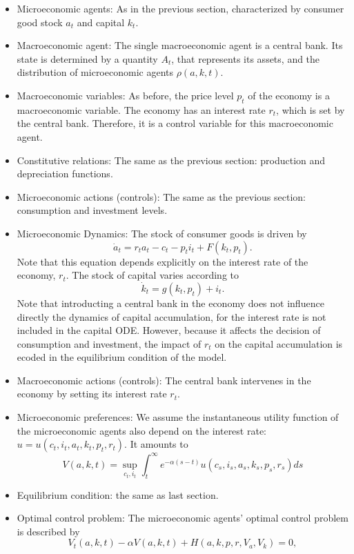 \documentclass{article}
\begin{document}
\begin{itemize}
    \item Microeconomic agents: As in the previous section, characterized by
    consumer good stock $a_t$ and capital $k_t$.
    \item Macroeconomic agent: The single macroeconomic agent is a central bank.
    Its state is determined by a quantity $A_t$, that represents its assets, and
    the distribution of microeconomic agents $\rho(a,k,t)$.
    \item Macroeconomic variables: As before, the price level $p_t$ of the economy is a macroeconomic
    variable. The economy has an interest rate $r_t$, which is set by the central bank. Therefore, it 
    is a control variable for this macroeconomic agent.
    \item Constitutive relations: The same as the previous section: production and depreciation functions.
    \item Microeconomic actions (controls): The same as the previous section: consumption and investment levels.
    \item Microeconomic Dynamics:
    The stock of consumer goods is driven by 
    $$
    \dot a_t = r_t a_t - c_t - p_t i_t + F(k_t, p_t).
    $$
    Note that this equation depends explicitly on the interest rate of the economy, $r_t$.
    The stock of capital varies according to
    $$
    \dot k_t = g(k_t, p_t) + i_t.
    $$
    Note that introducting a central bank in the economy does not influence directly
    the dynamics of capital accumulation, for the interest rate is not included in the capital ODE.
    However, because it affects the decision of consumption and investment, the impact of $r_t$ on
    the capital accumulation is ecoded in the equilibrium condition of the model.
    \item Macroeconomic actions (controls): The central bank intervenes in the economy by setting
    its interest rate $r_t$.
    \item Microeconomic preferences: We assume the instantaneous utility function of the microeconomic
    agents also depend on the interest rate: $u = u(c_t, i_t, a_t, k_t, p_t, r_t)$. It amounts to 
    $$
    V(a,k,t) = \sup_{c_t,i_t} \int^\infty_t e^{-\alpha(s-t)} u(c_s, i_s, a_s, k_s, p_s, r_s) ds
    $$ 
    \item Equilibrium condition: the same as last section.
    \item Optimal control problem: The microeconomic agents' optimal control problem is described by 
    $$
    V_t(a,k,t) - \alpha V(a,k,t) + H(a,k,p,r,V_a,V_k) = 0,
$$
\end{itemize}
\end{document}
